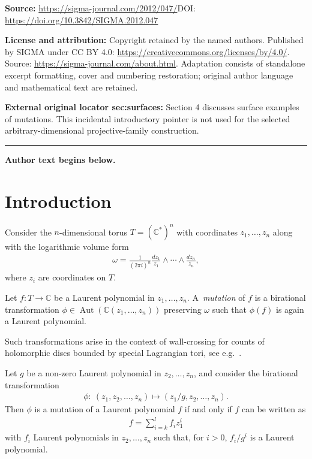 \documentclass[11pt]{article}
\newcommand{\CC}{\mathbb{C}}
\DeclareMathOperator{\aut}{Aut}
\begin{document}
\noindent\textbf{Source:} \url{https://sigma-journal.com/2012/047/}\quad DOI: \url{https://doi.org/10.3842/SIGMA.2012.047}\par
\noindent\textbf{License and attribution:} Copyright retained by the named authors. Published by SIGMA under CC BY 4.0: \url{https://creativecommons.org/licenses/by/4.0/}. Source: \url{https://sigma-journal.com/about.html}. Adaptation consists of standalone excerpt formatting, cover and numbering restoration; original author language and mathematical text are retained.\par
\noindent\textbf{External original locator sec:surfaces:} Section 4 discusses surface examples of mutations. This incidental introductory pointer is not used for the selected arbitrary-dimensional projective-family construction.\par
\medskip\hrule\medskip\noindent\textbf{Author text begins below.}\par
\setcounter{section}{0}
\setcounter{subsection}{0}
\setcounter{subsubsection}{0}
\setcounter{Theorem}{0}
\setcounter{equation}{0}
\section{Introduction}
Consider the $n$-dimensional torus $T=(\CC^*)^n$ with coordinates $z_1,\ldots,z_n$ along with the logarithmic volume form
\begin{gather*}
\omega=\frac{1}{(2\pi i)^n}\frac{d z_1}{z_1}\wedge \cdots \wedge \frac{d z_n}{z_n},
\end{gather*}
where $z_i$ are coordinates on $T$.
\begin{Definition}
	Let $f\colon T\to\CC$ be a Laurent polynomial in $z_1,\ldots,z_n$.
	A~\emph{mutation} of $f$ is a birational transformation $\phi\in\aut(\CC(z_1,\ldots,z_n))$
preserving $\omega$ such that $\phi(f)$ is again a Laurent polynomial.
\end{Definition}

 Such  transformations arise in the context of wall-crossing for counts of holomorphic discs bounded by special Lagrangian tori, see e.g.~\cite{auroux}.

\begin{Example}\label{ex:easymut}
Let $g$ be a non-zero Laurent polynomial in $z_2,\ldots,z_n$, and consider the birational transformation
\begin{gather*}	
	\phi: \ (z_1,z_2,\ldots,z_n)\mapsto (z_1/g,z_2,\ldots,z_n).
\end{gather*}
Then $\phi$ is a mutation of a Laurent polynomial $f$ if and only if $f$ can be written as
\begin{gather*}
f=\sum_{i=k}^l f_i z_1^i
\end{gather*}
with $f_i$ Laurent polynomials in $z_2,\ldots,z_n$ such that, for $i>0$, $f_i/g^i$ is a Laurent polynomial.
\end{Example}
\end{document}
